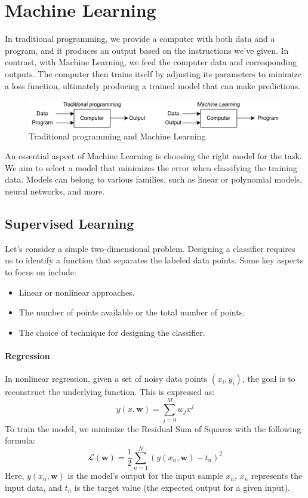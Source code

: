 \section{Machine Learning}

In traditional programming, we provide a computer with both data and a program, and it produces an output based on the instructions we've given. 
In contrast, with Machine Learning, we feed the computer data and corresponding outputs. 
The computer then trains itself by adjusting its parameters to minimize a loss function, ultimately producing a trained model that can make predictions.
\begin{figure}[H]
    \centering
    \includegraphics[width=1\linewidth]{images/eeai6.png}
    \caption{Traditional programming and Machine Learning}
\end{figure}
\noindent An essential aspect of Machine Learning is choosing the right model for the task. 
We aim to select a model that minimizes the error when classifying the training data. 
Models can belong to various families, such as linear or polynomial models, neural networks, and more.

\subsection{Supervised Learning}
Let's consider a simple two-dimensional problem. 
Designing a classifier requires us to identify a function that separates the labeled data points. 
Some key aspects to focus on include:
\begin{itemize}
    \item Linear or nonlinear approaches. 
    \item The number of points available or the total number of points. 
    \item The choice of technique for designing the classifier.
\end{itemize}

\paragraph*{Regression}
In nonlinear regression, given a set of noisy data points $(x_i,y_i)$, the goal is to reconstruct the underlying function. 
This is expressed as:
\[y(x,\mathbf{w})=\sum_{j=0}^{M}w_jx^j\]
\noindent To train the model, we minimize the Residual Sum of Squares with the following formula:
\[\mathcal{L}(\mathbf{w})=\dfrac{1}{2}\sum_{n=1}^N\left(y(x_n,\mathbf{w})-t_n\right)^2\]
Here, $y(x_n,\mathbf{w})$  is the model's output for the input sample $x_n$, $x_n$ represents the input data, and $t_n$ is the target value (the expected output for a given input).

